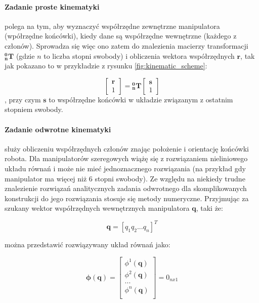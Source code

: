 \documentclass[a4paper, 12pt, twoside]{article}
\begin{document}
\paragraph{Zadanie proste kinematyki}polega na tym, aby wyznaczyć współrzędne zewnętrzne manipulatora (wpółrzędne końcówki), kiedy dane są współrzędne wewnętrzne (każdego z członów). Sprowadza się więc ono zatem do znalezienia macierzy transformacji $\bm{^{0}_{n}T}$ (gdzie $n$ to liczba stopni swobody) i obliczenia wektora współrzędnych $\bm{r}$, tak jak pokazano to w przykładzie z rysunku \ref{fig:kinematic_scheme}:

\begin{equation} \label{eq:4}
\begin{bmatrix}
\bm{r} \\
1
\end{bmatrix} = \bm{^{0}_{n}T}\begin{bmatrix}
								\bm{s} \\
								1
								\end{bmatrix}
\end{equation}, przy czym $\bm{s}$ to współrzędne końcówki w układzie związanym z ostatnim stopniem swobody.

\paragraph{Zadanie odwrotne kinematyki}służy obliczeniu współrzędnych członów znając położenie i orientację końcówki robota. Dla manipulatorów szeregowych wiążę się z rozwiązaniem nieliniowego układu równań i może nie mieć jednoznacznego rozwiązania (na przykład gdy manipulator ma więcej niż 6 stopni swobody). Ze względu na niekiedy trudne znalezienie rozwiązań analitycznych zadania odwrotnego dla skomplikowanych konstrukcji do jego rozwiązania stosuje się metody numeryczne. Przyjmując za szukany wektor współrzędnych wewnętrznych manipulatora $\bm{q}$, taki że:

\begin{equation} \label{eq:5}
\bm{q} = [ q_1  q_2  ...  q_n ]^T
\end{equation}

można przedstawić rozwiązywany układ równań jako:

\begin{equation} \label{eq:6}
\bm{\phi}(\bm{q}) = \begin{bmatrix}
					\phi^1(\bm{q}) \\
					\phi^2(\bm{q}) \\
					... \\
					\phi^n(\bm{q}) \\
					\end{bmatrix} = 0_{nx1}
\end{equation}
\end{document}
